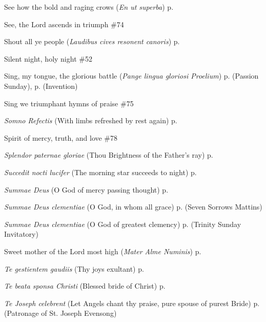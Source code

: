 \begin{hangparas}{1.25em}{1}
See how the bold and raging crows (\textit{En ut superba}) \dotfill p. \pageref{CompassionInvitatory}
\par\noindent
See, the Lord ascends in triumph \dotfill \#74
\par\noindent
Shout all ye people (\textit{Laudibus cives resonent canoris}) \dotfill p. \pageref{BenedictEvensong}
\par\noindent
Silent night, holy night \dotfill \#52
\par\noindent
Sing, my tongue, the glorious battle (\textit{Pange lingua gloriosi Proelium}) \dotfill p. \pageref{PassionSundayInvitatory} (Passion Sunday), p. \pageref{InventionInvitatory} (Invention)
\par\noindent
Sing we triumphant hymns of praise \dotfill \#75
\par\noindent
\textit{Somno Refectis} (With limbs refreshed by rest again) \dotfill p. \pageref{MondayInvitatory}
\par\noindent
Spirit of mercy, truth, and love \dotfill \#78
\par\noindent
\textit{Splendor paternae gloriae} (Thou Brightness of the Father's ray) \dotfill p. \pageref{MondayMattinsWinter}
\par\noindent
\textit{Succedit nocti lucifer} (The morning star succeeds to night) \dotfill p. \pageref{AnneMattins}
\par\noindent
\textit{Summae Deus} (O God of mercy passing thought) \dotfill p. \pageref{SaturdayInvitatory}
\par\noindent
\textit{Summae Deus clementiae} (O God, in whom all grace) \dotfill p. \pageref{SevenSorrowsMattins} (Seven Sorrows Mattins)
\par\noindent
\textit{Summae Deus clementiae} (O God of greatest clemency) \dotfill p. \pageref{TrinityInvitatory} (Trinity Sunday Invitatory)
\par\noindent
Sweet mother of the Lord most high (\textit{Mater Alme Numinis}) \dotfill p. \pageref{MotherhoodMattins}
\par\noindent
\textit{Te gestientem gaudiis} (Thy joys exultant) \dotfill p. \pageref{HolyRosaryEvensongII}
\par\noindent
\textit{Te beata sponsa Christi} (Blessed bride of Christ) \dotfill p. \pageref{ScholasticaEvensong}
\par\noindent
\textit{Te Joseph celebrent} (Let Angels chant thy praise, pure spouse of purest Bride) \dotfill p. \pageref{PatronageEvensong} (Patronage of St. Joseph Evensong)
\par\noindent

\end{hangparas}
